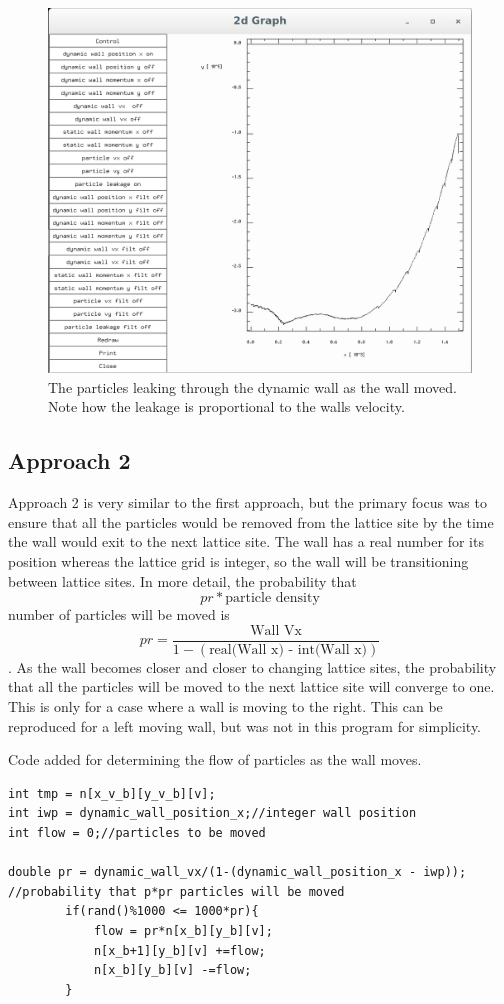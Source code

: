 \documentclass{article}
\begin{document}
\begin{figure}[H]
\includegraphics[scale=0.35]{A1p5.png}
\caption{\label{fig} The particles leaking through the dynamic wall as the wall moved. Note how the leakage is proportional to the walls velocity.}
\end{figure}

\subsection{Approach 2}
Approach 2 is very similar to the first approach, but the primary focus was to ensure that all the particles would be removed from the lattice site by the time the wall would exit to the next lattice site. The wall has a real number for its position whereas the lattice grid is integer, so the wall will be transitioning between lattice sites. In more detail, the probability that $$ pr * \textrm{particle density}$$ number of particles will be moved is $$pr = \frac{\textrm{Wall Vx}}{1-(\textrm{real(Wall x) - int(Wall x)})}$$. As the wall becomes closer and closer to changing lattice sites, the probability that all the particles will be moved to the next lattice site will converge to one. This is only for a case where a wall is moving to the right. This can be reproduced for a left moving wall, but was not in this program for simplicity.

\vspace{5mm}
Code added for determining the flow of particles as the wall moves.
\begin{verbatim}
int tmp = n[x_v_b][y_v_b][v];
int iwp = dynamic_wall_position_x;//integer wall position
int flow = 0;//particles to be moved
		
double pr = dynamic_wall_vx/(1-(dynamic_wall_position_x - iwp));
//probability that p*pr particles will be moved
		if(rand()%1000 <= 1000*pr){
			flow = pr*n[x_b][y_b][v];
			n[x_b+1][y_b][v] +=flow;
			n[x_b][y_b][v] -=flow;
		}
 \end{verbatim}
\vspace{5mm}
\end{document}
